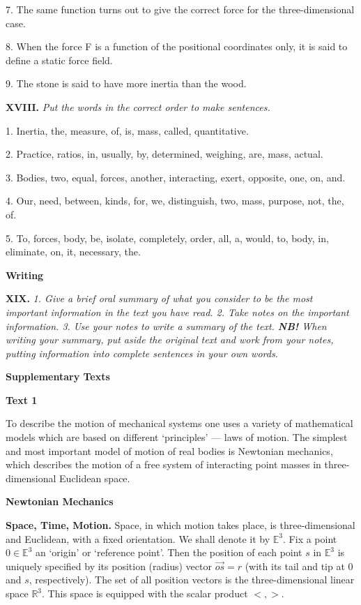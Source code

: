 \documentclass[a4paper]{article}
\newcommand{\ESect}[1]{\medskip\par{\large \textbf{#1}}\par}
\newcommand{\ETask}[2]{\medskip\par\textbf{#1.} \textit{#2}\par}
\begin{document}
7. The same function turns out to give the correct force for the three-dimensional case.

8. When the force F is a function of the positional coordinates only, it is said to define a static force field.

9. The stone is said to have more inertia than the wood.

\ETask{XVIII}{Put the words in the correct order to make sentences.}
1. Inertia, the, measure, of, is, mass, called, quantitative.

2. Practice, ratios, in, usually, by, determined, weighing, are, mass, actual.

3. Bodies, two, equal, forces, another, interacting, exert, opposite, one, on, and.

4. Our, need, between, kinds, for, we, distinguish, two, mass, purpose, not, the, of.

5. To, forces, body, be, isolate, completely, order, all, a, would, to, body, in, eliminate, on, it, necessary, the.

\ESect{Writing}

\ETask{XIX}{1. Give a brief oral summary of what you consider to be the most important information in the text you have read.
2. Take notes on the important information. 3. Use your notes to write a summary of the text. \textbf{NB!} When writing your
summary, put aside the original text and work from your notes, putting information into complete sentences in your own words.}

\ESect{Supplementary Texts}

\ESect{Text 1}
To describe the motion of mechanical systems one uses a variety of mathematical models which are based on different `principles'
--- laws of motion. The simplest and most important model of motion of real bodies is Newtonian mechanics, which describes the
motion of a free system of interacting point masses in three-dimensional Euclidean space.

\textbf{Newtonian Mechanics}

\textbf{Space, Time, Motion.} Space, in which motion takes place, is three-dimensional and Euclidean, with a fixed orientation.
We shall denote it by $\mathbb{E}^3$. Fix a point $0 \in \mathbb{E}^3$ an `origin' or `reference point'. Then the position of
each point $s$ in $\mathbb{E}^3$ is uniquely specified by its position (radius) vector $\overrightarrow{os}= r$ (with its tail
and tip at 0 and $s$, respectively). The set of all position vectors is the three-dimensional linear space $\mathbb{R}^3$. This
space is equipped with the scalar product $<,>$.
\end{document}
